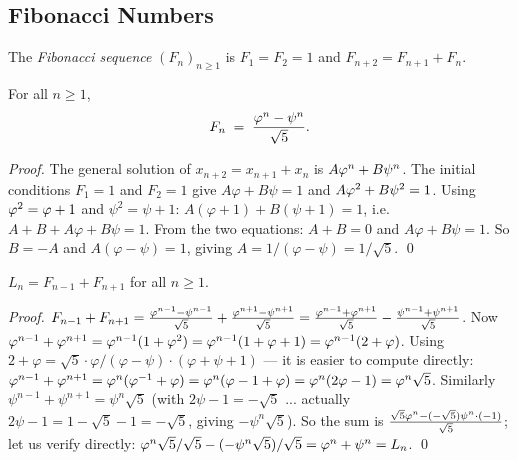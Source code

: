 \subsection{Fibonacci Numbers}

\begin{definition}\label{def:fibonacci}
  The \emph{Fibonacci sequence} $(F_n)_{n \geq 1}$ is $F_1 = F_2 = 1$
  and $F_{n+2} = F_{n+1} + F_n$.
\end{definition}

\begin{theorem}\label{thm:binet}
  For all $n \geq 1$,
  \[
    F_n \;=\; \frac{\varphi^{n} - \psi^n}{\sqrt{5}}.
  \]
\end{theorem}

\begin{proof}
  The general solution of $x_{n+2} = x_{n+1} + x_n$ is
  $A\varphi^{n} + B\psi^n$.  The initial conditions $F_1=1$ and $F_2=1$
  give $A\varphi + B\psi = 1$ and $A\varphi^{2} + B\psi^2 = 1$.
  Using $\varphi^{2} = \varphi+1$ and $\psi^2 = \psi+1$:
  $A(\varphi+1) + B(\psi+1) = 1$, i.e.\ $A+B + A\varphi + B\psi = 1$.
  From the two equations: $A+B = 0$ and $A\varphi + B\psi = 1$.
  So $B = -A$ and $A(\varphi-\psi) = 1$, giving $A = 1/(\varphi-\psi) = 1/\sqrt{5}$.
  \qed
\end{proof}

\begin{corollary}\label{cor:fib-lucas}
  $L_n = F_{n-1} + F_{n+1}$ for all $n \geq 1$.
\end{corollary}

\begin{proof}
  $F_{n-1} + F_{n+1} = \frac{\varphi^{n-1}-\psi^{n-1}}{\sqrt{5}}
  + \frac{\varphi^{n+1}-\psi^{n+1}}{\sqrt{5}}
  = \frac{\varphi^{n-1}+\varphi^{n+1}}{\sqrt{5}} - \frac{\psi^{n-1}+\psi^{n+1}}{\sqrt{5}}$.
  Now $\varphi^{n-1}+\varphi^{n+1} = \varphi^{n-1}(1+\varphi^{2}) = \varphi^{n-1}(1+\varphi+1)
  = \varphi^{n-1}(2+\varphi)$.  Using $2+\varphi = \sqrt{5}\cdot\varphi/(\varphi-\psi)\cdot(\varphi+\psi+1)$
  — it is easier to compute directly: $\varphi^{n-1}+\varphi^{n+1} = \varphi^{n}(\varphi^{-1}+\varphi)
  = \varphi^{n}(\varphi-1+\varphi) = \varphi^{n}(2\varphi-1) = \varphi^{n}\sqrt{5}$.
  Similarly $\psi^{n-1}+\psi^{n+1} = \psi^n\sqrt{5}$ (with $2\psi-1=-\sqrt{5}$
  ... actually $2\psi-1 = 1-\sqrt{5}-1=-\sqrt{5}$, giving $-\psi^n\sqrt{5}$).
  So the sum is $\frac{\sqrt{5}\varphi^{n} - (-\sqrt{5})\psi^n \cdot (-1)}{\sqrt{5}}$;
  let us verify directly: $\varphi^{n}\sqrt{5}/\sqrt{5} - (-\psi^n\sqrt{5})/\sqrt{5}
  = \varphi^{n} + \psi^n = L_n$.  \qed
\end{proof}

